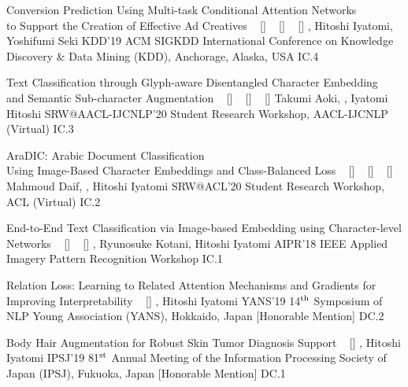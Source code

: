 \begin{publications}
    \publication
    {Conversion Prediction Using Multi-task Conditional Attention Networks \\ to Support the Creation of Effective Ad Creatives}
    {
    ~ [\href{https://doi.org/10.1145/3292500.3330789}{\small{\doiSymbol}}]
    ~ [\href{https://arxiv.org/abs/1905.07289}{\small{\arxivSymbol}}]
    ~ [\href{https://github.com/shunk031/Multi-task-Conditional-Attention-Networks}{\small{\githubSymbol}}]
    }
    {\underline{}, Hitoshi Iyatomi, Yoshifumi Seki}
    {KDD'19} {ACM SIGKDD International Conference on Knowledge Discovery \& Data Mining (KDD), Anchorage, Alaska, USA} {IC.4}

    \publication
    {Text Classification through Glyph-aware Disentangled Character Embedding \\ and Semantic Sub-character Augmentation}
    {
    ~ [\href{https://aclanthology.org/2020.aacl-srw.1/}{\small{\linkSymbol}}]
    ~ [\href{https://arxiv.org/abs/2011.04184}{\small{\arxivSymbol}}]
    ~ [\href{https://github.com/IyatomiLab/GDCE-SSA}{\small{\githubSymbol}}]
    }
    {Takumi Aoki, \underline{}, Iyatomi Hitoshi}
    {SRW@AACL-IJCNLP'20} {Student Research Workshop, AACL-IJCNLP (Virtual)} {IC.3}

    \publication
    {AraDIC: Arabic Document Classification \\ Using Image-Based Character Embeddings and Class-Balanced Loss}
    {
    ~ [\href{http://dx.doi.org/10.18653/v1/2020.acl-srw.29}{\small{\doiSymbol}}]
    ~ [\href{https://arxiv.org/abs/2006.11586}{\small{\arxivSymbol}}]
    ~ [\href{https://github.com/IyatomiLab/GDCE-SSA}{\small{\githubSymbol}}]
    }
    {Mahmoud Daif, \underline{}, Hitoshi Iyatomi}
    {SRW@ACL'20} {Student Research Workshop, ACL (Virtual)} {IC.2}

    \publication
    {End-to-End Text Classification via Image-based Embedding using Character-level Networks}
    {
    ~ [\href{https://doi.org/10.1109/AIPR.2018.8707407}{\small{\doiSymbol}}]
    ~ [\href{https://arxiv.org/abs/1810.03595}{\small{\arxivSymbol}}]
    }
    {\underline{}, Ryunosuke Kotani, Hitoshi Iyatomi}
    {AIPR'18} {IEEE Applied Imagery Pattern Recognition Workshop} {IC.1}

    \publication
    {Relation Loss: Learning to Related Attention Mechanisms and Gradients for Improving Interpretability}
    {
    ~ [\href{https://www.hosei.ac.jp/gs/NEWS/zaigaku/koganei/20190920/}{\small{\linkSymbol}}]
    }
    {\underline{}, Hitoshi Iyatomi}
    {YANS'19} {14$^{\textrm{\scriptsize th}}$ Symposium of NLP Young Association (YANS), Hokkaido, Japan [Honorable Mention]} {DC.2}

    \publication
    {Body Hair Augmentation for Robust Skin Tumor Diagnosis Support}
    {
    ~ [\href{https://www.hosei.ac.jp/gs/NEWS/topics/jusho/190411_4/}{\small{\linkSymbol}}]
    }
    {\underline{}, Hitoshi Iyatomi}
    {IPSJ'19} {81$^{\textrm{\scriptsize st}}$ Annual Meeting of the Information Processing Society of Japan (IPSJ), Fukuoka, Japan [Honorable Mention]} {DC.1}

\end{publications}
